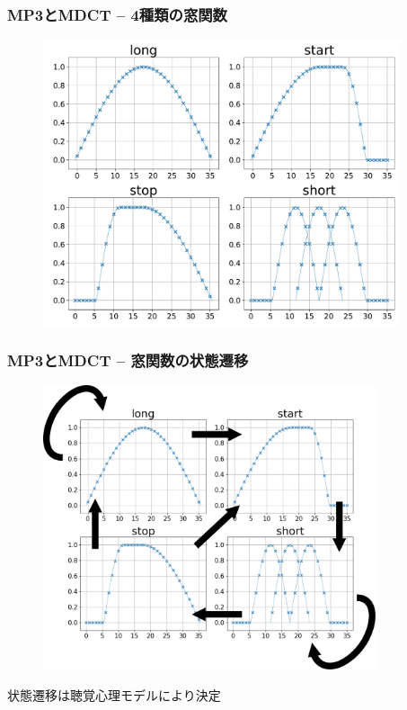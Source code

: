 \documentclass[14pt,xcolor=dvipsnames,table,dvipdfmx]{beamer}
\begin{document}
\begin{frame}[c]
    \frametitle{MP3とMDCT -- 4種類の窓関数}
    \begin{figure}
        \includegraphics[width=105mm]{./figs/window_functions.pdf}
    \end{figure}
\end{frame}

\begin{frame}[c]
    \frametitle{MP3とMDCT -- 窓関数の状態遷移}
    \begin{figure}
        \includegraphics[width=98mm]{./figs/window_function_transition.png}
    \end{figure}
    \vspace{-27pt}
    状態遷移は聴覚心理モデルにより決定
\end{frame}
\end{document}
